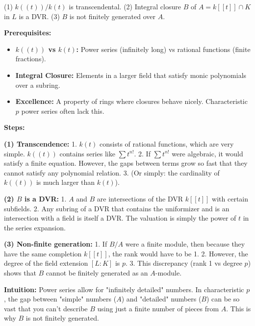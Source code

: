 \begin{exercise}
\label{algebra:2024:4}
(1) $k((t))/k(t)$ is transcendental.
(2) Integral closure $B$ of $A = k[[t]] \cap K$ in $L$ is a DVR.
(3) $B$ is not finitely generated over $A$.
\end{exercise}

\begin{solution}
\textbf{Prerequisites:}
\begin{itemize}
    \item \textbf{$k((t))$ vs $k(t)$:} Power series (infinitely long) vs rational functions (finite fractions).
    \item \textbf{Integral Closure:} Elements in a larger field that satisfy monic polynomials over a subring.
    \item \textbf{Excellence:} A property of rings where closures behave nicely. Characteristic $p$ power series often lack this.
\end{itemize}

\textbf{Steps:}

\textbf{(1) Transcendence:}
1. $k(t)$ consists of rational functions, which are very simple. $k((t))$ contains series like $\sum t^{n!}$.
2. If $\sum t^{n!}$ were algebraic, it would satisfy a finite equation. However, the gaps between terms grow so fast that they cannot satisfy any polynomial relation.
3. (Or simply: the cardinality of $k((t))$ is much larger than $k(t)$).

\textbf{(2) $B$ is a DVR:}
1. $A$ and $B$ are intersections of the DVR $k[[t]]$ with certain subfields.
2. Any subring of a DVR that contains the uniformizer and is an intersection with a field is itself a DVR. The valuation is simply the power of $t$ in the series expansion.

\textbf{(3) Non-finite generation:}
1. If $B/A$ were a finite module, then because they have the same completion $k[[t]]$, the rank would have to be 1.
2. However, the degree of the field extension $[L:K]$ is $p$.
3. This discrepancy (rank 1 vs degree $p$) shows that $B$ cannot be finitely generated as an $A$-module.

\textbf{Intuition:}
Power series allow for "infinitely detailed" numbers. In characteristic $p$, the gap between "simple" numbers ($A$) and "detailed" numbers ($B$) can be so vast that you can't describe $B$ using just a finite number of pieces from $A$. This is why $B$ is not finitely generated.
\end{solution}

